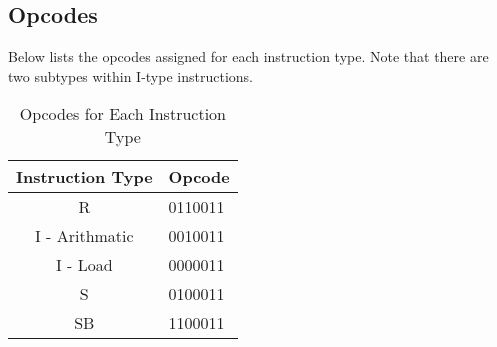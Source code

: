 \begin{table}[!h]
    \centering
    \caption{Branching Instructions}
    \label{table:branching_instructions}
\end{table}

\subsection{Opcodes}
Below lists the opcodes assigned for each instruction type. Note that there are two subtypes within I-type instructions.
\begin{table}[!h]
    \centering
    \caption{Opcodes for Each Instruction Type}
    \label{table:opcodes}
    \begin{tabular}{|c|l|}
        \hline
        \textbf{Instruction Type} & \multicolumn{1}{c|}{\textbf{Opcode}} \\ \hline
        R                         & 0110011                              \\ \hline
        I - Arithmatic            & 0010011                              \\ \hline
        I - Load                  & 0000011                              \\ \hline
        S                         & 0100011                              \\ \hline
        SB                        & 1100011                              \\ \hline
    \end{tabular}
\end{table}

